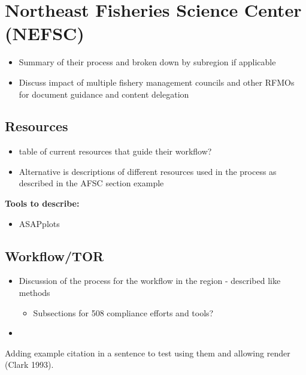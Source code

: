 \documentclass[
  letterpaper,
  oneside,
  open=any]{scrbook}
\providecommand{\tightlist}{%
  \setlength{\itemsep}{0pt}\setlength{\parskip}{0pt}}\usepackage{longtable,booktabs,array}
\begin{document}

\chapter{Northeast Fisheries Science Center
(NEFSC)}\label{northeast-fisheries-science-center-nefsc}

\begin{itemize}
\item
  Summary of their process and broken down by subregion if applicable
\item
  Discuss impact of multiple fishery management councils and other RFMOs
  for document guidance and content delegation
\end{itemize}

\section{Resources}\label{resources-1}

\begin{itemize}
\item
  table of current resources that guide their workflow?
\item
  Alternative is descriptions of different resources used in the process
  as described in the AFSC section example
\end{itemize}

\textbf{Tools to describe:}

\begin{itemize}
\tightlist
\item
  ASAPplots
\end{itemize}

\section{Workflow/TOR}\label{workflowtor}

\begin{itemize}
\item
  Discussion of the process for the workflow in the region - described
  like methods

  \begin{itemize}
  \tightlist
  \item
    Subsections for 508 compliance efforts and tools?
  \end{itemize}
\item
\end{itemize}

Adding example citation in a sentence to test using them and allowing
render (Clark 1993).
\end{document}
